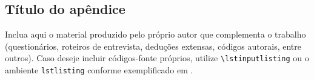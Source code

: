 \begin{apendicesenv}
  \chapter{Título do apêndice}
  Inclua aqui o material produzido pelo próprio autor que complementa o trabalho (questionários, roteiros de entrevista, deduções extensas, códigos autorais, entre outros). Caso deseje incluir códigos-fonte próprios, utilize \texttt{\textbackslash lstinputlisting} ou o ambiente \texttt{lstlisting} conforme exemplificado em .
\end{apendicesenv}
